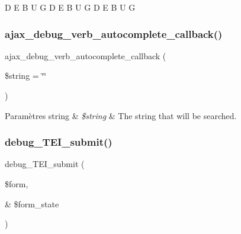 D E B U G D E B U G D E B U G \hypertarget{php_2conjoc__debug__web_form_8inc_aedd67c4b770b58826708010ce4ef7ac7}{}\label{php_2conjoc__debug__web_form_8inc_aedd67c4b770b58826708010ce4ef7ac7} 
\subsubsection{\texorpdfstring{ajax\+\_\+debug\+\_\+verb\+\_\+autocomplete\+\_\+callback()}{ajax\_debug\_verb\_autocomplete\_callback()}}
{\footnotesize\ttfamily ajax\+\_\+debug\+\_\+verb\+\_\+autocomplete\+\_\+callback (\begin{DoxyParamCaption}\item[{}]{\$string = {\ttfamily \char`\"{}\char`\"{}} }\end{DoxyParamCaption})}


\begin{DoxyParams}[1]{Paramètres}
string & {\em \$string} & The string that will be searched. \\
\hline
\end{DoxyParams}
\hypertarget{php_2conjoc__debug__web_form_8inc_af6a94ce95f29fca17e5a3fb82855e835}{}\label{php_2conjoc__debug__web_form_8inc_af6a94ce95f29fca17e5a3fb82855e835} 
\subsubsection{\texorpdfstring{debug\+\_\+\+T\+E\+I\+\_\+submit()}{debug\_TEI\_submit()}}
{\footnotesize\ttfamily debug\+\_\+\+T\+E\+I\+\_\+submit (\begin{DoxyParamCaption}\item[{}]{\$form,  }\item[{\&}]{\$form\+\_\+state }\end{DoxyParamCaption})}

